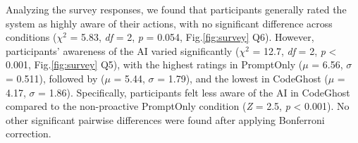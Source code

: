 Analyzing the survey responses, we found that participants generally rated the system as highly aware of their actions, with no significant difference across conditions (\textit{$\chi^2$} = 5.83, \textit{df} = 2, \textit{p} = 0.054, Fig.\ref{fig:survey} Q6). 
However, participants'  awareness of the AI  varied significantly (\textit{$\chi^2$} = 12.7, \textit{df} = 2, \textit{p} < 0.001, Fig.\ref{fig:survey} Q5), with the highest ratings in PromptOnly ($\mu$ = 6.56, $\sigma$ = 0.511), followed by \sys{} ($\mu$ = 5.44, $\sigma$ = 1.79), and the lowest in CodeGhost ($\mu$ = 4.17, $\sigma$ = 1.86). 
Specifically, participants felt less aware of the AI in CodeGhost compared to the non-proactive PromptOnly condition (\textit{Z} = 2.5, \textit{p} < 0.001). 
No other significant pairwise differences were found after applying Bonferroni correction. 


